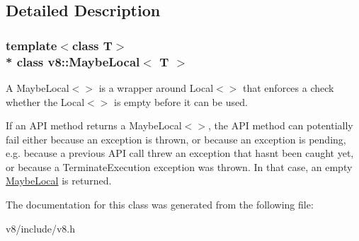 \subsection{Detailed Description}
\subsubsection*{template$<$class T$>$\\*
class v8\+::\+Maybe\+Local$<$ T $>$}

A Maybe\+Local$<$$>$ is a wrapper around Local$<$$>$ that enforces a check whether the Local$<$$>$ is empty before it can be used.

If an A\+PI method returns a Maybe\+Local$<$$>$, the A\+PI method can potentially fail either because an exception is thrown, or because an exception is pending, e.\+g. because a previous A\+PI call threw an exception that hasn\textquotesingle{}t been caught yet, or because a Terminate\+Execution exception was thrown. In that case, an empty \hyperlink{classv8_1_1MaybeLocal}{Maybe\+Local} is returned. 

The documentation for this class was generated from the following file\+:\begin{DoxyCompactItemize}
\item 
v8/include/v8.\+h\end{DoxyCompactItemize}
